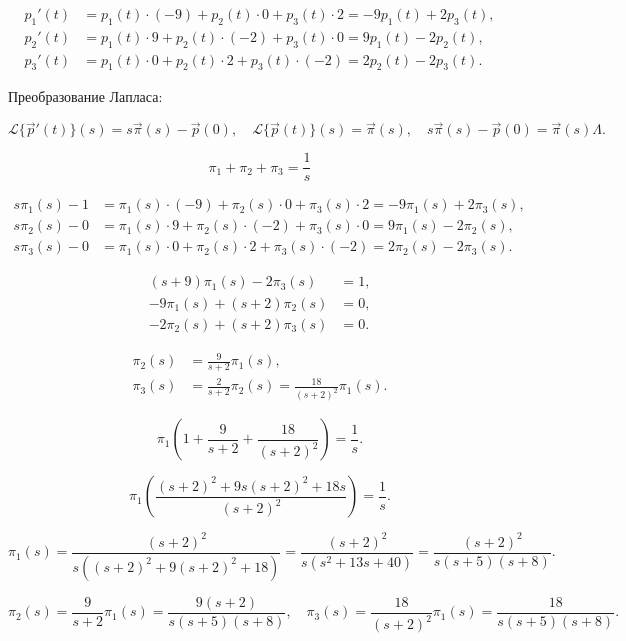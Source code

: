 \[
	\begin{aligned}
		p_1'(t) & =  p_1 (t)\cdot(-9) + p_2(t)\cdot 0 + p_3(t)\cdot 2 = -9p_1(t)+2p_3(t), \\
		p_2'(t) & =  p_1 (t)\cdot 9 + p_2(t)\cdot(-2) + p_3(t)\cdot 0 = 9p_1(t)-2p_2(t),  \\
		p_3'(t) & =  p_1 (t)\cdot 0 + p_2(t)\cdot 2 + p_3(t)\cdot(-2) = 2p_2(t)-2p_3(t).
	\end{aligned}
\]

Преобразование Лапласа:

\[
	\mathcal{L}\{\vec p'(t)\}(s)=s \vec \pi(s)-\vec p(0)
	,\quad
	\mathcal{L}\{\vec p(t)\}(s)=\vec \pi(s)
	,\quad
	s \vec \pi(s)-\vec p(0)=\vec \pi(s)\Lambda.
\]

\[
	\pi_1+\pi_2+\pi_3=\frac{1}{s}
\]

\[
	\begin{aligned}
		s \pi_1(s)-1 & = \pi_1(s)\cdot(-9) + \pi_2(s)\cdot 0 + \pi_3(s)\cdot 2 = -9\pi_1(s)+2\pi_3(s), \\
		s \pi_2(s)-0 & = \pi_1(s)\cdot 9 + \pi_2(s)\cdot(-2) + \pi_3(s)\cdot 0 = 9\pi_1(s)-2\pi_2(s),  \\
		s \pi_3(s)-0 & = \pi_1(s)\cdot 0 + \pi_2(s)\cdot 2 + \pi_3(s)\cdot(-2) = 2\pi_2(s)-2\pi_3(s).
	\end{aligned}
\]

\[
	\begin{aligned}
		(s+9)\pi_1(s)-2\pi_3(s)  & = 1, \\
		-9\pi_1(s)+(s+2)\pi_2(s) & = 0, \\
		-2\pi_2(s)+(s+2)\pi_3(s) & = 0.
	\end{aligned}
\]

\[
	\begin{aligned}
		\pi_2(s) & = \frac{9}{s+2}\pi_1(s),                              \\
		\pi_3(s) & = \frac{2}{s+2}\pi_2(s) = \frac{18}{(s+2)^2}\pi_1(s).
	\end{aligned}
\]

\[
	\pi_1(1+ \frac{9}{s+2} + \frac{18}{(s+2)^2}) = \frac{1}{s}.
\]

\[
	\pi_1\left(\frac{(s+2)^2+9s(s+2)^2+ 18s}{(s+2)^2}\right) = \frac{1}{s}.
\]

\[
	\pi_1(s) = \frac{(s+2)^2}{s((s+2)^2+9(s+2)^2+ 18)}
	= \frac{(s+2)^2}{s(s^2+13s+40)}
	= \frac{(s+2)^2}{s(s+5)(s+8)}.
\]

\[
	\pi_2(s) = \frac{9}{s+2}\pi_1(s) = \frac{9(s+2)}{s(s+5)(s+8)},
	\quad
	\pi_3(s) = \frac{18}{(s+2)^2}\pi_1(s) = \frac{18}{s(s+5)(s+8)}.
\]


